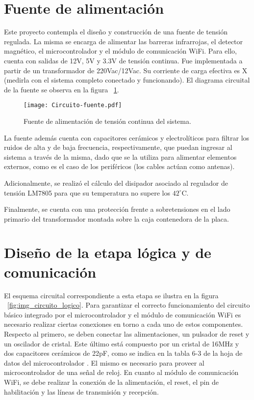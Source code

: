 \section{Fuente de alimentación}
Este proyecto contempla el diseño y construcción de una fuente de tensión regulada. La misma se encarga de alimentar las barreras infrarrojas, el detector magnético, el microcontrolador y el módulo de comunicación WiFi. Para ello, cuenta con salidas de 12V, 5V y 3.3V de tensión continua. Fue implementada a partir de un transformador de 220Vac/12Vac. \textcolor{mGreen}{Su corriente de carga efectiva es X (medirla con el sistema completo conectado y funcionando).} El diagrama circuital de la fuente se observa en la figura ~\ref{fig:img_circuito_fuente}.
\begin{figure}[H]
	\centering
	\texttt{[image: Circuito-fuente.pdf]}
	\caption{Fuente de alimentación de tensión continua del sistema.}
	\label{fig:img_circuito_fuente}
\end{figure}

La fuente además cuenta con capacitores cerámicos y electrolíticos para filtrar los ruidos de alta y de baja frecuencia, respectivamente, que puedan ingresar al sistema a través de la misma, dado que se la utiliza para alimentar elementos externos, como es el caso de los periféricos (los cables actúan como antenas). 

Adicionalmente, se realizó el cálculo del disipador asociado al regulador de tensión LM7805 para que su temperatura no supere los $42^{\circ}$C. 

Finalmente, se cuenta con una protección frente a sobretensiones en el lado primario del transformador montada sobre la caja contenedora de la placa.


\section{Diseño de la etapa lógica y de comunicación}

El esquema circuital correspondiente a esta etapa se ilustra en la figura ~\ref{fig:img_circuito_logico}. Para garantizar el correcto funcionamiento del circuito básico integrado por el microcontrolador y el módulo de comunicación WiFi es necesario realizar ciertas conexiones en torno a cada uno de estos componentes.
Respecto al primero, se deben conectar las alimentaciones, un pulsador de reset y un oscilador de cristal. Este último está compuesto por un cristal de 16MHz y dos capacitores cerámicos de 22pF, como se indica en la tabla 6-3 de la hoja de datos del microcontrolador \cite{atmega328p}. El mismo es necesario para proveer al microcontrolador de una señal de reloj. En cuanto al módulo de comunicación WiFi, se debe realizar la conexión de la alimentación, el reset, el pin de habilitación y las líneas de transmisión y recepción.

